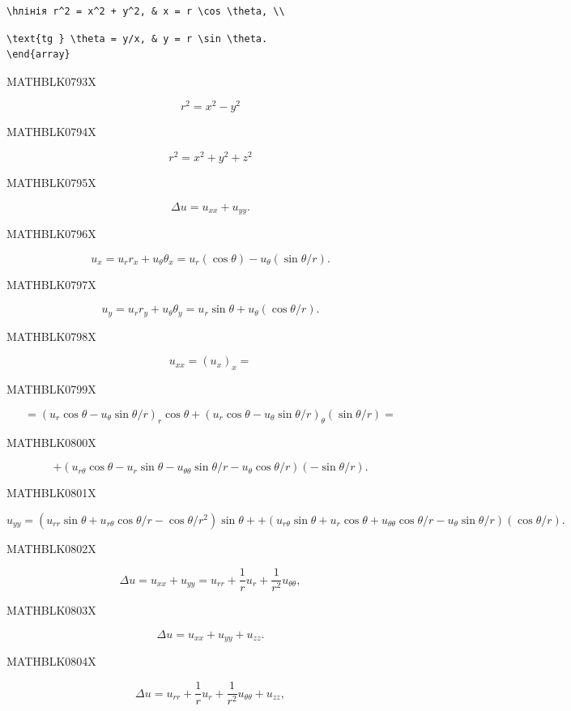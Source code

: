 \documentclass[
  ukrainian,
]{article}
\begin{document}
\begin{verbatim}
\hлінія r^2 = x^2 + y^2, & x = r \cos \theta, \\
\end{verbatim}

\begin{verbatim}
\text{tg } \theta = y/x, & y = r \sin \theta.
\end{array}
\end{verbatim}

MATHBLK0793X

\[
r^2 = x^2 - y^2
\]

MATHBLK0794X

\[
r^2 = x^2 + y^2 + z^2
\]

MATHBLK0795X

\[
\Delta u = u_{xx} + u_{yy}.
\]

MATHBLK0796X

\[
u_x = u_r r_x + u_\theta \theta_x = u_r (\cos \theta) - u_\theta (\sin \theta/r).
\]

MATHBLK0797X

\[
u_y = u_r r_y + u_\theta \theta_y = u_r \sin \theta + u_\theta (\cos \theta/r).
\]

MATHBLK0798X

\[
u_{xx} = (u_x)_x =
\]

MATHBLK0799X

\[
= (u_r \cos \theta - u_\theta \sin \theta/r)_r \cos \theta + (u_r \cos \theta - u_\theta \sin \theta/r)_\theta (\sin \theta/r) =
\]

MATHBLK0800X

\[
+ (u_{r\theta} \cos \theta - u_r \sin \theta - u_{\theta\theta} \sin \theta/r - u_\theta \cos \theta/r) (-\sin \theta/r).
\]

MATHBLK0801X

\[
u_{yy} = (u_{rr}\sin\theta + u_{r\theta}\cos\theta/r - \cos\theta/r^2)\sin\theta + + (u_{r\theta}\sin\theta + u_{r}\cos\theta + u_{\theta\theta}\cos\theta/r - u_{\theta}\sin\theta/r)(\cos\theta/r).
\]

MATHBLK0802X

\[
\Delta u = u_{xx} + u_{yy} = u_{rr} + \frac{1}{r} u_r + \frac{1}{r^2} u_{\theta\theta},
\]

MATHBLK0803X

\[
\Delta u = u_{xx} + u_{yy} + u_{zz}.
\]

MATHBLK0804X

\[
\Delta u = u_{rr} + \frac{1}{r} u_r + \frac{1}{r^2} u_{\theta\theta} + u_{zz},
\]
\end{document}
